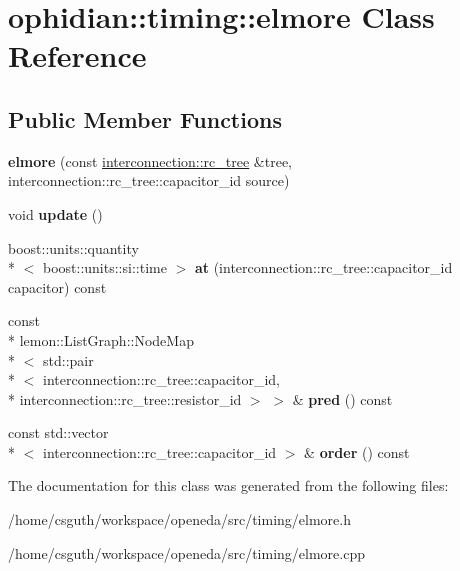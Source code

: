 \hypertarget{classophidian_1_1timing_1_1elmore}{\section{ophidian\-:\-:timing\-:\-:elmore Class Reference}
\label{classophidian_1_1timing_1_1elmore}
}
\subsection*{Public Member Functions}
\begin{DoxyCompactItemize}
\item 
\hypertarget{classophidian_1_1timing_1_1elmore_ad8309fff264fbfc5f82310fe669605a4}{{\bfseries elmore} (const \hyperlink{classophidian_1_1interconnection_1_1rc__tree}{interconnection\-::rc\-\_\-tree} \&tree, interconnection\-::rc\-\_\-tree\-::capacitor\-\_\-id source)}\label{classophidian_1_1timing_1_1elmore_ad8309fff264fbfc5f82310fe669605a4}

\item 
\hypertarget{classophidian_1_1timing_1_1elmore_a1da1fad65ca359baa0fe890a88c06125}{void {\bfseries update} ()}\label{classophidian_1_1timing_1_1elmore_a1da1fad65ca359baa0fe890a88c06125}

\item 
\hypertarget{classophidian_1_1timing_1_1elmore_ae0a847f6d99e8e388c78a3f452060618}{boost\-::units\-::quantity\\*
$<$ boost\-::units\-::si\-::time $>$ {\bfseries at} (interconnection\-::rc\-\_\-tree\-::capacitor\-\_\-id capacitor) const }\label{classophidian_1_1timing_1_1elmore_ae0a847f6d99e8e388c78a3f452060618}

\item 
\hypertarget{classophidian_1_1timing_1_1elmore_a696582c33ed7028fae6e2504c7dd534f}{const \\*
lemon\-::\-List\-Graph\-::\-Node\-Map\\*
$<$ std\-::pair\\*
$<$ interconnection\-::rc\-\_\-tree\-::capacitor\-\_\-id, \\*
interconnection\-::rc\-\_\-tree\-::resistor\-\_\-id $>$ $>$ \& {\bfseries pred} () const }\label{classophidian_1_1timing_1_1elmore_a696582c33ed7028fae6e2504c7dd534f}

\item 
\hypertarget{classophidian_1_1timing_1_1elmore_a623be5b85590424ebed37d5da77bf9da}{const std\-::vector\\*
$<$ interconnection\-::rc\-\_\-tree\-::capacitor\-\_\-id $>$ \& {\bfseries order} () const }\label{classophidian_1_1timing_1_1elmore_a623be5b85590424ebed37d5da77bf9da}

\end{DoxyCompactItemize}


The documentation for this class was generated from the following files\-:\begin{DoxyCompactItemize}
\item 
/home/csguth/workspace/openeda/src/timing/elmore.\-h\item 
/home/csguth/workspace/openeda/src/timing/elmore.\-cpp\end{DoxyCompactItemize}
